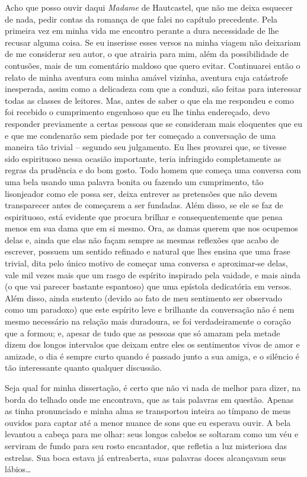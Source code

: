  Acho que posso ouvir daqui \textit{Madame} de Hautcastel, que não me
deixa esquecer de nada, pedir contas da romança de que falei no
capítulo precedente. Pela primeira vez em minha vida me encontro
perante a dura necessidade de lhe recusar alguma coisa. Se eu inserisse
esses versos na minha viagem não deixariam de me considerar seu autor,
o que atrairia para mim, além da possibilidade de contusões, mais de
um comentário maldoso que quero evitar. Continuarei então o relato de
minha aventura com minha amável vizinha, aventura cuja catástrofe
inesperada, assim como a delicadeza com que a conduzi, são feitas para
interessar todas as classes de leitores. Mas, antes de saber o que ela
me respondeu e como foi recebido o cumprimento engenhoso que eu lhe
tinha endereçado, devo responder previamente a certas pessoas que se
consideram mais eloquentes que eu e que me condenarão sem piedade por
ter começado a conversação de uma maneira tão trivial -- segundo seu
julgamento. Eu lhes provarei que, se tivesse sido espirituoso nessa
ocasião importante, teria infringido completamente as regras da
prudência e do bom gosto. Todo homem que começa uma conversa com uma
bela usando uma palavra bonita ou fazendo um cumprimento, tão
lisonjeador como ele possa ser, deixa entrever as pretensões que não
devem transparecer antes de começarem a ser fundadas. Além disso, se
ele se faz de espirituoso, está evidente que procura brilhar e
consequentemente que pensa menos em sua dama que em si mesmo. Ora, as
damas querem que nos ocupemos delas e, ainda que elas não façam sempre
as mesmas reflexões que acabo de escrever, possuem um sentido refinado
e natural que lhes ensina que uma frase trivial, dita pelo único motivo
de começar uma conversa e aproximar-se delas, vale mil vezes mais que
um rasgo de espírito inspirado pela vaidade, e mais ainda (o que vai
parecer bastante espantoso) que uma epístola dedicatória em versos.
Além disso, ainda sustento (devido ao fato de meu sentimento ser
observado como um paradoxo) que este espírito leve e brilhante da
conversação não é nem mesmo necessário na relação mais duradoura, se
foi verdadeiramente o coração que a formou; e, apesar de tudo que as
pessoas que só amaram pela metade dizem dos longos intervalos que
deixam entre eles os sentimentos vivos de amor e amizade, o dia é
sempre curto quando é passado junto a sua amiga, e o silêncio é tão
interessante quanto qualquer discussão. 

 Seja qual for minha dissertação, é certo que não vi nada de melhor para
dizer, na borda do telhado onde me encontrava, que as tais palavras em
questão. Apenas as tinha pronunciado e minha alma se transportou
inteira ao tímpano de meus ouvidos para captar até a menor nuance de
sons que eu esperava ouvir. A bela levantou a cabeça para me olhar:
seus longos cabelos se soltaram como um véu e serviram de fundo para
seu rosto encantador, que refletia a luz misteriosa das estrelas. Sua
boca estava já entreaberta, suas palavras doces alcançavam seus
lábios\ldots

